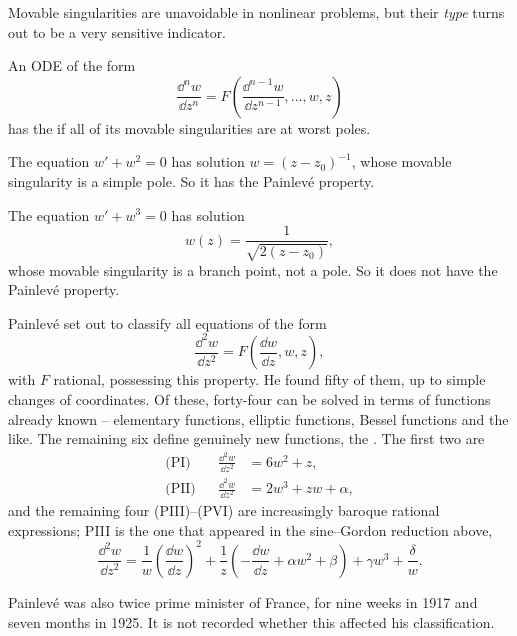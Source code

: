 Movable singularities are unavoidable in nonlinear problems, but their \emph{type} turns out to be a very sensitive indicator.

\begin{definition}
	An ODE of the form
	$$
	\frac{\dd^nw}{\dd z^n} = F\left(\frac{\dd^{n-1}w}{\dd z^{n-1}},\dots,w,z\right)
	$$
	has the  if all of its movable singularities are at worst poles.
\end{definition}

\begin{example}
	The equation $w' + w^2 = 0$ has solution $w = (z-z_0)^{-1}$, whose movable singularity is a simple pole. So it has the Painlev\'e property.
\end{example}

\begin{example}
	The equation $w' + w^3 = 0$ has solution
	$$
	w(z) = \frac{1}{\sqrt{2(z-z_0)}},
	$$
	whose movable singularity is a branch point, not a pole. So it does not have the Painlev\'e property.
\end{example}

Painlev\'e set out to classify all equations of the form
$$
\frac{\dd^2w}{\dd z^2} = F\left(\frac{\dd w}{\dd z}, w, z\right),
$$
with $F$ rational, possessing this property. He found fifty of them, up to simple changes of coordinates. Of these, forty-four can be solved in terms of functions already known -- elementary functions, elliptic functions, Bessel functions and the like. The remaining six define genuinely new functions, the . The first two are
\begin{align*}
	\text{(PI)}&& \frac{\dd^2w}{\dd z^2} &= 6w^2 + z,\\
	\text{(PII)}&& \frac{\dd^2w}{\dd z^2} &= 2w^3 + zw + \alpha,
\end{align*}
and the remaining four (PIII)--(PVI) are increasingly baroque rational expressions; PIII is the one that appeared in the sine--Gordon reduction above,
$$
\frac{\dd^2w}{\dd z^2} = \frac1w\left(\frac{\dd w}{\dd z}\right)^2 + \frac1z\left(-\frac{\dd w}{\dd z} + \alpha w^2 + \beta\right) + \gamma w^3 + \frac\delta w.
$$

\begin{remark}
	Painlev\'e was also twice prime minister of France, for nine weeks in 1917 and seven months in 1925. It is not recorded whether this affected his classification.
\end{remark}

